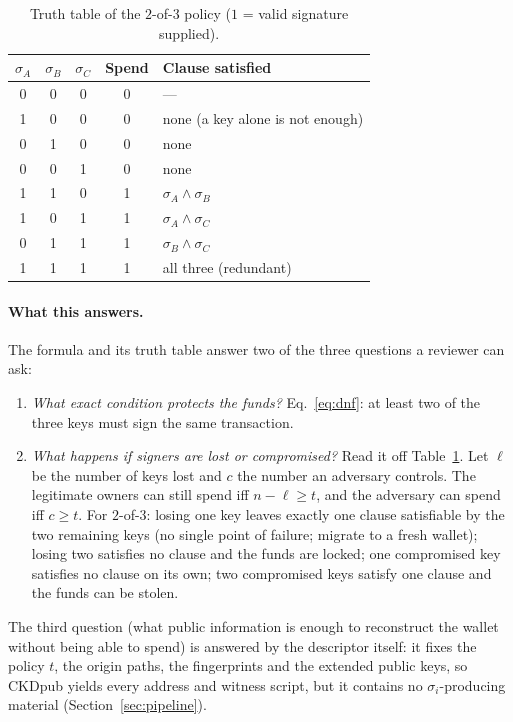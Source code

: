 \documentclass[11pt,a4paper]{article}
\theoremstyle{plain}
\theoremstyle{definition}
\begin{document}
\begin{table}[H]
\centering
\caption{Truth table of the $2$-of-$3$ policy ($1$ = valid signature supplied).}
\label{tab:truth}
\begin{tabular}{ccc c l}
\toprule
$\sigma_A$ & $\sigma_B$ & $\sigma_C$ & Spend & Clause satisfied \\
\midrule
0 & 0 & 0 & 0 & --- \\
1 & 0 & 0 & 0 & none (a key alone is not enough) \\
0 & 1 & 0 & 0 & none \\
0 & 0 & 1 & 0 & none \\
1 & 1 & 0 & 1 & $\sigma_A\wedge\sigma_B$ \\
1 & 0 & 1 & 1 & $\sigma_A\wedge\sigma_C$ \\
0 & 1 & 1 & 1 & $\sigma_B\wedge\sigma_C$ \\
1 & 1 & 1 & 1 & all three (redundant) \\
\bottomrule
\end{tabular}
\end{table}

\paragraph{What this answers.} The formula and its truth table answer two of the
three questions a reviewer can ask:
\begin{enumerate}[label=(\arabic*),leftmargin=*]
    \item \emph{What exact condition protects the funds?} Eq.~\eqref{eq:dnf}:
    at least two of the three keys must sign the same transaction.
    \item \emph{What happens if signers are lost or compromised?} Read it off
    Table~\ref{tab:truth}. Let $\ell$ be the number of keys lost and $c$ the
    number an adversary controls. The legitimate owners can still spend iff
    $n-\ell\ge t$, and the adversary can spend iff $c\ge t$. For $2$-of-$3$:
    losing one key leaves exactly one clause satisfiable by the two remaining
    keys (no single point of failure; migrate to a fresh wallet); losing two
    satisfies no clause and the funds are locked; one compromised key satisfies
    no clause on its own; two compromised keys satisfy one clause and the funds
    can be stolen.
\end{enumerate}
The third question (what public information is enough to reconstruct the wallet
without being able to spend) is answered by the descriptor itself: it fixes the
policy $t$, the origin paths, the fingerprints and the extended public keys, so
CKDpub yields every address and witness script, but it contains no
$\sigma_i$-producing material (Section~\ref{sec:pipeline}).
\end{document}
